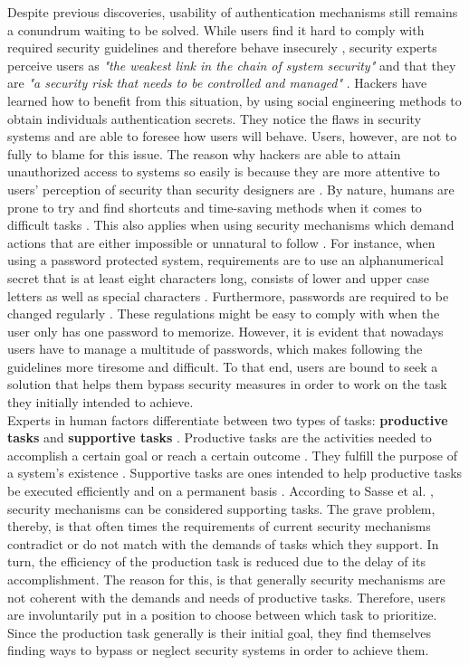 Despite previous discoveries, usability of authentication mechanisms still remains a conundrum waiting to be solved. While users find it hard to comply with required security guidelines and therefore behave insecurely \cite{Adams:1999:UE:322796.322806, sasse}, security experts perceive users as \textit{"the weakest link in the chain of system security"} \cite{sasse} and that they are \textit{"a security risk that needs to be controlled and managed"}  \cite{Adams:1999:UE:322796.322806}. Hackers have learned how to benefit from this situation, by using social engineering methods to obtain individuals authentication secrets\cite{Adams:1999:UE:322796.322806, sasse}. They notice the flaws in security systems and are able to foresee how users will behave. Users, however, are not to fully to blame for this issue. The reason why hackers are able to attain unauthorized access to systems so easily is because they are more attentive to users' perception of security than security designers are \cite{Adams:1999:UE:322796.322806}. By nature, humans are prone to try and find shortcuts and time-saving methods when it comes to difficult tasks \cite{sasse}. This also applies when using security mechanisms which demand actions that are either impossible or unnatural to follow \cite{sasse}. For instance, when using a password protected system, requirements are to use an alphanumerical secret that is at least eight characters long, consists of lower and upper case letters as well as special characters \cite{payne, sasse}. Furthermore, passwords are required to be changed regularly \cite{adams2,gorman}. These regulations might be easy to comply with when the user only has one password to memorize. However, it is evident that nowadays users have to manage a multitude of passwords, which makes following the guidelines more tiresome and difficult. To that end, users are bound to seek a solution that helps them bypass security measures in order to work on the task they initially intended to achieve. \\

Experts in human factors differentiate between two types of tasks: \textbf{productive tasks} and \textbf{supportive tasks} \cite{sasse}. Productive tasks are the activities needed to accomplish a certain goal or reach a certain outcome \cite{sasse}. They fulfill the purpose of a system's existence \cite{sasse}. Supportive tasks are ones intended to help productive tasks be executed efficiently and on a permanent basis \cite{sasse}. According to Sasse et al. \cite{sasse}, security mechanisms can be considered supporting tasks. The grave problem, thereby, is that often times the requirements of current security mechanisms contradict or do not match with the demands of tasks which they support. In turn, the efficiency of the production task is reduced due to the delay of its accomplishment. The reason for this, is that generally security mechanisms are not coherent with the demands and needs of productive tasks. Therefore, users are involuntarily put in a position to choose between which task to prioritize. Since the production task generally is their initial goal, they find themselves finding ways to bypass or neglect security systems in order to achieve them. 

